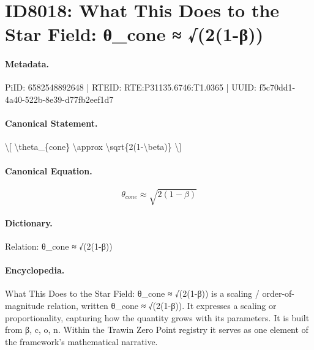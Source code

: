 \section*{ID8018: What This Does to the Star Field: θ\_cone ≈ √(2(1-β))}
\paragraph{Metadata.}
PiID: 6582548892648 | RTEID: RTE:P31135.6746:T1.0365 | UUID: f5c70dd1-4a40-522b-8e39-d77fb2eef1d7

\paragraph{Canonical Statement.}
\textbackslash{}[ \textbackslash{}theta\_\{cone\} \textbackslash{}approx \textbackslash{}sqrt\{2(1-\textbackslash{}beta)\} \textbackslash{}]

\paragraph{Canonical Equation.}
\[
\theta_{cone} \approx \sqrt{2(1-\beta)}
\]

\paragraph{Dictionary.}
Relation: θ\_cone ≈ √(2(1-β))

\paragraph{Encyclopedia.}
What This Does to the Star Field: θ\_cone ≈ √(2(1-β)) is a scaling / order-of-magnitude relation, written θ\_cone ≈ √(2(1-β)). It expresses a scaling or proportionality, capturing how the quantity grows with its parameters. It is built from β, c, o, n. Within the Trawin Zero Point registry it serves as one element of the framework's mathematical narrative.
